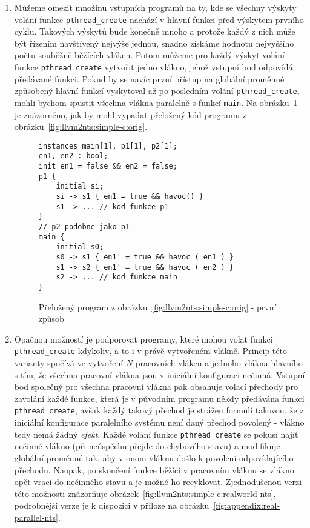 \documentclass[12pt]{fithesis2}
\begin{document}
\begin{enumerate}
\item \label{subsec:llvm2nts:paralelism-simple} Můžeme omezit množinu vstupních programů na ty, kde se všechny výskyty volání funkce \texttt{pthread\_create} nachází v hlavní funkci před výskytem prvního cyklu. Takových výskytů bude konečně mnoho a protože každý z nich může být řízením navštívený nejvýše jednou, snadno získáme hodnotu nejvyššího počtu souběžně běžících vláken. Potom můžeme pro každý výskyt volání funkce \texttt{pthread\_create} vytvořit jedno vlákno, jehož vstupní bod odpovídá předávané funkci. Pokud by se navíc první přístup na globální proměnné způsobený hlavní funkcí vyskytoval až po posledním volání \texttt{pthread\_create}, mohli bychom spustit všechna vlákna paralelně s funkcí \texttt{main}. Na obrázku~\ref{fig:llvm2nts:simple-c:simple-nts} je znázorněno, jak by mohl vypadat přeložený kód programu z obrázku~\ref{fig:llvm2nts:simple-c:orig}.

\begin{figure}[t]
\begin{lstlisting}
instances main[1], p1[1], p2[1];
en1, en2 : bool;
init en1 = false && en2 = false;
p1 {
	initial si;
	si -> s1 { en1 = true && havoc() }
	s1 -> ... // kod funkce p1
}
// p2 podobne jako p1
main {
	initial s0;
	s0 -> s1 { en1' = true && havoc ( en1 ) }
	s1 -> s2 { en1' = true && havoc ( en2 ) }
	s2 -> ... // kod funkce main
}
\end{lstlisting}
\caption{Přeložený program z obrázku~\ref{fig:llvm2nts:simple-c:orig} - první způsob}
\label{fig:llvm2nts:simple-c:simple-nts}
\end{figure}

\item \label{subsec:llvm2nts:paralelism-complex}Opačnou možností je podporovat programy, které mohou volat funkci \texttt{pthread\_create} kdykoliv, a to i v právě vytvořeném vlákně. Princip této varianty spočívá ve vytvoření $N$ pracovních vláken a jednoho vlákna hlavního s tím, že všechna pracovní vlákna jsou v iniciální konfiguraci nečinná. Vstupní bod společný pro všechna pracovní vlákna pak obsahuje volací přechody pro zavolání každé funkce, která je v původním programu někdy předávána funkci \texttt{pthread\_create}, avšak každý takový přechod je strážen formulí takovou, že z iniciální konfigurace paralelního systému není daný přechod povolený - vlákno tedy nemá žádný \textit{efekt}. Každé volání funkce \texttt{pthread\_create} se pokusí najít nečinné vlákno (při neúspěchu přejde do chybového stavu) a modifikuje globální proměnné tak, aby v onom vláknu došlo k povolení odpovídajícího přechodu. Naopak, po skončení funkce běžící v pracovním vláknu se vlákno opět vrací do nečinného stavu a je možné ho recyklovat. Zjednodušenou verzi této možnosti znázorňuje obrázek~\ref{fig:llvm2nts:simple-c:realworld-nts}, podrobnější verze je k dispozici v příloze na obrázku~\ref{fig:appendix:real-parallel-nts}.
\end{enumerate}
\end{document}
